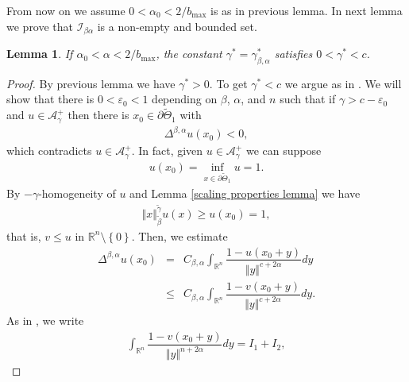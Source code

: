 \documentclass[10pt, leqno]{article}
\newtheorem{lemma}[theorem]{Lemma}
\theoremstyle{definition}
\theoremstyle{remark}
\numberwithin{equation}{section}
\begin{document}
From now on we assume $0 < \alpha_{0} < 2/b_{\max}$ is as in previous lemma. In next lemma we prove that $\mathcal{I}_{\beta\alpha}$ is a non-empty and bounded set.
\begin{lemma}
\label{fund. sol. lemma 1}
If $ \alpha_{0} < \alpha < 2/b_{\max}$, the constant $\gamma_{}^{\ast} = \gamma_{\beta, \alpha}^{\ast}$ satisfies $0< \gamma_{}^{\ast} < c$.
\end{lemma}
\begin{proof}
By previous lemma we have $\gamma^{\ast} > 0$. To get $\gamma^{\ast} < c$ we argue as in \cite{CWW}. We will show that there is $0 < \varepsilon_{0} < 1$ depending on $\beta$, $\alpha$, and $n$ such that if $\gamma > c - \varepsilon_{0}$ and $u \in \mathcal{A}^{+}_{\gamma}$ then there is $x_{0} \in \partial \tilde{\Theta}_{1}$ with
\begin{eqnarray}
\label{contradiction ineq fund. sol. lemma 1 1}
\Delta^{\beta, \alpha}u(x_{0}) < 0,
\end{eqnarray}
which contradicts $u \in \mathcal{A}^{+}_{\gamma}$. In fact, given $u \in \mathcal{A}^{+}_{\gamma}$ we can suppose
\begin{eqnarray}
u(x_{0}) = \displaystyle\inf_{x \in \partial \tilde{\Theta}_{1}}u = 1.
\end{eqnarray}
By $-\gamma$-homogeneity of $u$ and Lemma \ref{scaling properties lemma} we have
\begin{eqnarray}
\Vert x \Vert^{\tilde{\gamma} }_{\tilde{\beta}} u(x) \geq u(x_{0}) = 1,
\end{eqnarray}
that is, $v \leq u$ in $\mathbb{R}^{n}\setminus \left\lbrace 0 \right\rbrace.$
Then, we estimate
\begin{eqnarray}
\label{contradiction ineq fund. sol. lemma 1 2}
\Delta^{\beta, \alpha}u(x_{0}) & = & C_{\beta, \alpha}\int_{\mathbb{R}^{n}} \dfrac{1 - u(x_{0} + y)}{\Vert y \Vert^{c + 2\alpha}} dy \\ \nonumber
& \leq & C_{\beta, \alpha} \int_{\mathbb{R}^{n}} \dfrac{1 - v(x_{0} + y)}{\Vert y \Vert^{c+2\alpha}} dy.
\end{eqnarray}
As in \cite{CWW}, we write
\begin{eqnarray}
\label{contradiction ineq fund. sol. lemma 1 3}
\int_{\mathbb{R}^{n}} \dfrac{1 - v(x_{0} + y)}{\Vert y \Vert^{n + 2\alpha}} dy = I_{1} + I_{2},
\end{eqnarray}

\end{proof}
\end{document}
